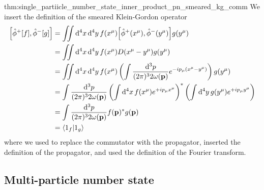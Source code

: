 \begin{delayedproof}{thm:single_partiicle_number_state_inner_product_pn_smeared_kg_comm}
	We insert the definition of the smeared Klein-Gordon operator
	\begin{equation*}
		\begin{split}
			\comm{\hat\phi^+[f]}{\hat\phi^-[g]}
			&=
			\iint\dd[4]{x}\dd[4]{y}
			f(x^\mu)
			\comm{\hat\phi^+(x^\mu)}{\hat\phi^-(y^\mu)}
			g(y^\mu)
			\\
			&=
			\iint\dd[4]{x}\dd[4]{y}
			f(x^\mu)
			D(x^\mu-y^\mu)
			g(y^\mu)
			\\
			&=
			\iint\dd[4]{x}\dd[4]{y}
			f(x^\mu)
			\left(
				\int\frac{\dd[3]{p}}{(2\pi)^32\omega(\vb{p})}
				e^{-ip_\mu (x^\mu-y^\mu)}
			\right)
			g(y^\mu)
			\\
			&=
			\int\frac{\dd[3]{p}}{(2\pi)^32\omega(\vb{p})}
			\left(
				\int\dd[4]{x}
				f(x^\mu)
				e^{+ip_\mu x^\mu}
			\right)^*
			\left(
				\int\dd[4]{y}
				g(y^\mu)
				e^{+ip_\mu y^\mu}
			\right)
			\\
			&=
			\int\frac{\dd[3]{p}}{(2\pi)^32\omega(\vb{p})}
			f(\vb{p})^*
			g(\vb{p})
			\\
			&=
			\braket{1_f}{1_g}
		\end{split}
	\end{equation*}
	where we used  to replace the commutator with the propagator, inserted the definition of the propagator, and used the definition of the Fourier transform.
\end{delayedproof}

\subsection{Multi-particle number state}

